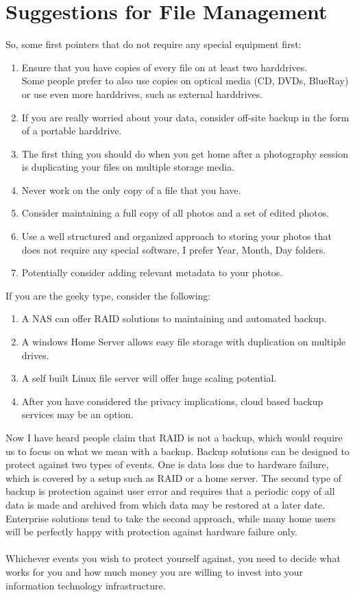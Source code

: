 \section{Suggestions for File Management}

So, some first pointers that do not require any special equipment first:

\begin{enumerate}
	\item Ensure that you have copies of every file on at least two harddrives. 
	\\ Some people prefer to also use copies on optical media (CD, DVDs, BlueRay) or use even more harddrives, such as external harddrives.
	\item If you are really worried about your data, consider off-site backup in the form of a portable harddrive.
	\item The first thing you should do when you get home after a photography session is duplicating your files on multiple storage media.
	\item Never work on the only copy of a file that you have.
	\item Consider maintaining a full copy of all photos and a set of edited photos.
	\item Use a well structured and organized approach to storing your photos that does not require any special software, I prefer Year, Month, Day folders.
	\item Potentially consider adding relevant metadata to your photos.
\end{enumerate}

If you are the geeky type, consider the following:

\begin{enumerate}
	\item A NAS can offer RAID solutions to maintaining and automated backup.
	\item A windows Home Server allows easy file storage with duplication on multiple drives.
	\item A self built Linux file server will offer huge scaling potential.
	\item After you have considered the privacy implications, cloud based backup services may be an option.
\end{enumerate}

Now I have heard people claim that RAID is not a backup, which would require us to focus on what we mean with a backup. 
Backup solutions can be designed to protect against two types of events. One is data loss due to hardware failure, which is covered by a setup such as RAID or a home server. The second type of backup is protection against user error and requires that a periodic copy of all data is made and archived from which data may be restored at a later date. Enterprise solutions tend to take the second approach, while many home users will be perfectly happy with protection against hardware failure only.
\\
\\
Whichever events you wish to protect yourself against, you need to decide what works for you and how much money you are willing to invest into your information technology infrastructure.




